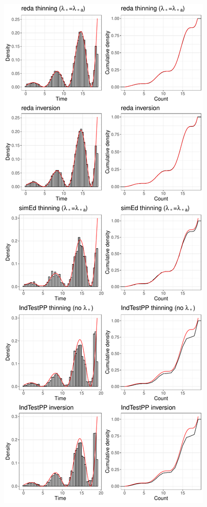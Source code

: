 \documentclass[article,nojss]{jss}\usepackage[]{graphicx}\usepackage[]{xcolor}
\makeatletter
\def\maxwidth{ %
  \ifdim\Gin@nat@width>\linewidth
    \linewidth
  \else
    \Gin@nat@width
  \fi
}
\newenvironment{knitrout}{}{} %
\makeatother
\begin{document}
\begin{knitrout}
\color{fgcolor}\begin{figure}

{\centering \includegraphics[width=\maxwidth,height=\textheight,keepaspectratio=true]{figure/epdf-r-pkgs-times-1} 

}
\end{figure}
\end{knitrout}
\end{document}
